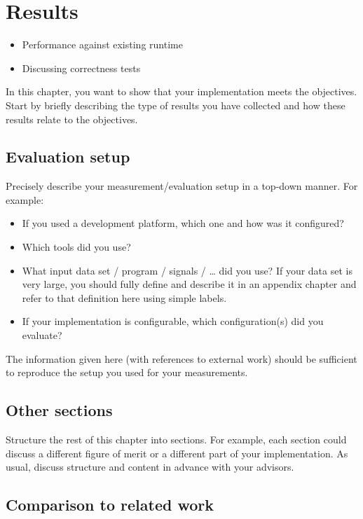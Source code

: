 \chapter{Results}
\label{ch:results}

\begin{itemize}
  \item Performance against existing runtime
  \item Discussing correctness tests
\end{itemize}

{\color{red}
	In this chapter, you want to show that your implementation meets the objectives.
	Start by briefly describing the type of results you have collected and how these results relate to the objectives.

	\section{Evaluation setup}

	Precisely describe your measurement/evaluation setup in a top-down manner.
	For example:
	\begin{itemize}
		\item If you used a development platform, which one and how was it configured?
		\item Which tools did you use?
		\item What input data set / program / signals / \ldots{} did you use?
		      If your data set is very large, you should fully define and describe it in an appendix chapter and refer to that definition here using simple labels.
		\item If your implementation is configurable, which configuration(s) did you evaluate?
	\end{itemize}

	The information given here (with references to external work) should be sufficient to reproduce the setup you used for your measurements.

	\section{Other sections}

	Structure the rest of this chapter into sections.
	For example, each section could discuss a different figure of merit or a different part of your implementation.
	As usual, discuss structure and content in advance with your advisors.

	\section{Comparison to related work}

}
